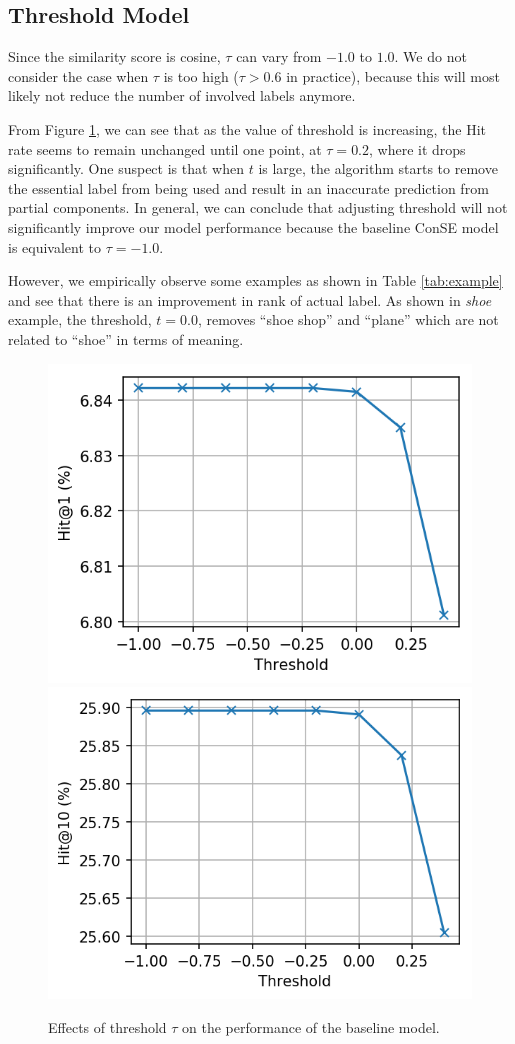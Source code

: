 \documentclass[11pt,letterpaper]{article}
\begin{document}
\subsection{Threshold Model}
Since the similarity score is cosine, $\tau$ can vary from $-1.0$ to $1.0$. We do not consider the case when $\tau$ is too high ($\tau>0.6$ in practice), because this will most likely not reduce the number of involved labels anymore. 

From Figure \ref{fig:threshold}, we can see that as the value of threshold is increasing, the Hit rate seems to remain unchanged until one point, at $\tau = 0.2$, where it drops significantly. One suspect is that when $t$ is large, the algorithm starts to remove the essential label from being used and result in an inaccurate prediction from partial components. In general, we can conclude that adjusting threshold will not significantly improve our model performance because the baseline ConSE model is equivalent to $\tau = -1.0$.

However, we empirically observe some examples as shown in Table \ref{tab:example} and see that there is an improvement in rank of actual label. As shown in \textit{shoe} example, the threshold, $t = 0.0$, removes ``shoe shop'' and ``plane'' which are not related to ``shoe'' in terms of meaning.   



\begin{figure}[ht]
\centering
\includegraphics[width=0.48\columnwidth]{threshold_synbase_k1.png} \hfill
\includegraphics[width=0.48\columnwidth]{threshold_synbase_k10.png} 
\caption{Effects of threshold $\tau$ on the performance of the baseline model.}
\label{fig:threshold}
\end{figure}
\end{document}
